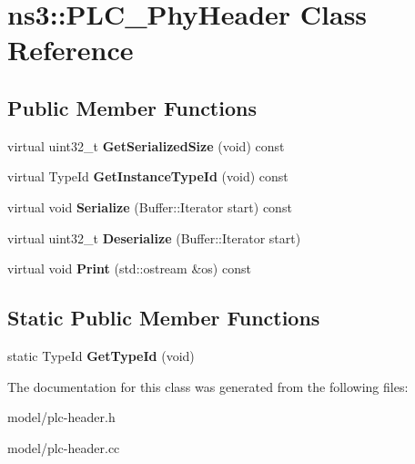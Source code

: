 \hypertarget{classns3_1_1PLC__PhyHeader}{\section{ns3\-:\-:\-P\-L\-C\-\_\-\-Phy\-Header \-Class \-Reference}
\label{classns3_1_1PLC__PhyHeader}
}
\subsection*{\-Public \-Member \-Functions}
\begin{DoxyCompactItemize}
\item 
\hypertarget{classns3_1_1PLC__PhyHeader_ab1f4537f97df7a8e81372fad277053ca}{virtual uint32\-\_\-t {\bfseries \-Get\-Serialized\-Size} (void) const }\label{classns3_1_1PLC__PhyHeader_ab1f4537f97df7a8e81372fad277053ca}

\item 
\hypertarget{classns3_1_1PLC__PhyHeader_abbb96f40da1f89c7b27b60f929bf6e0d}{virtual \-Type\-Id {\bfseries \-Get\-Instance\-Type\-Id} (void) const }\label{classns3_1_1PLC__PhyHeader_abbb96f40da1f89c7b27b60f929bf6e0d}

\item 
\hypertarget{classns3_1_1PLC__PhyHeader_a12eb375964529e3a7ff395947bb2297a}{virtual void {\bfseries \-Serialize} (\-Buffer\-::\-Iterator start) const }\label{classns3_1_1PLC__PhyHeader_a12eb375964529e3a7ff395947bb2297a}

\item 
\hypertarget{classns3_1_1PLC__PhyHeader_a33ab90866a2e16b238dde2322007b9e2}{virtual uint32\-\_\-t {\bfseries \-Deserialize} (\-Buffer\-::\-Iterator start)}\label{classns3_1_1PLC__PhyHeader_a33ab90866a2e16b238dde2322007b9e2}

\item 
\hypertarget{classns3_1_1PLC__PhyHeader_ad0a6ac60838555c71b124840f963ba4f}{virtual void {\bfseries \-Print} (std\-::ostream \&os) const }\label{classns3_1_1PLC__PhyHeader_ad0a6ac60838555c71b124840f963ba4f}

\end{DoxyCompactItemize}
\subsection*{\-Static \-Public \-Member \-Functions}
\begin{DoxyCompactItemize}
\item 
\hypertarget{classns3_1_1PLC__PhyHeader_a020d616c80972ce17b309cb886371fed}{static \-Type\-Id {\bfseries \-Get\-Type\-Id} (void)}\label{classns3_1_1PLC__PhyHeader_a020d616c80972ce17b309cb886371fed}

\end{DoxyCompactItemize}


\-The documentation for this class was generated from the following files\-:\begin{DoxyCompactItemize}
\item 
model/plc-\/header.\-h\item 
model/plc-\/header.\-cc\end{DoxyCompactItemize}
